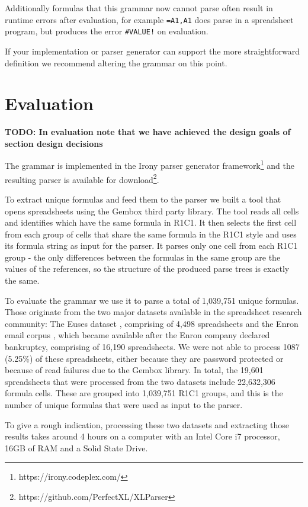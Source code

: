 \documentclass[conference]{IEEEtran}
\newcommand{\todo}[1]{\textbf{TODO: #1}}
\begin{document}
Additionally formulas that this grammar now cannot parse often result in runtime errors after evaluation, for example \texttt{=A1,A1} does parse in a spreadsheet program, but produces the error \texttt{\#VALUE!} on evaluation.

If your implementation or parser generator can support the more straightforward definition we recommend altering the grammar on this point.


\section{Evaluation}
\label{sec:evaluation}

\todo{In evaluation note that we have achieved the design goals of section design decisions}

The grammar is implemented in the Irony parser generator framework\footnote{https://irony.codeplex.com/} and the resulting parser is available for download\footnote{https://github.com/PerfectXL/XLParser}.

To extract unique formulas and feed them to the parser we built a tool that opens spreadsheets using the Gembox third party library. The tool reads all cells and identifies which have the same formula in R1C1. It then selects the first cell from each group of cells that share the same formula in the R1C1 style and uses its formula string as input for the parser. It parses only one cell from each R1C1 group - the only differences between the formulas in the same group are the values of the references, so the structure of the produced parse trees is exactly the same.

To evaluate the grammar we use it to parse a total of 1,039,751 unique formulas. Those originate from the two major datasets available in the spreadsheet research community: The Euses dataset \cite{euses}, comprising of 4,498 spreadsheets and the Enron email corpus \cite{enron}, which became available after the Enron company declared bankruptcy, comprising of 16,190 spreadsheets. We were not able to process 1087 (5.25\%) of these spreadsheets, either because they are password protected or because of read failures due to the Gembox library. In total, the 19,601 spreadsheets that were processed from the two datasets include 22,632,306 formula cells. These are grouped into 1,039,751 R1C1 groups, and this is the number of unique formulas that were used as input to the parser.

To give a rough indication, processing these two datasets and extracting those results takes around 4 hours on a computer with an Intel Core i7 processor, 16GB of RAM and a Solid State Drive.
\end{document}
